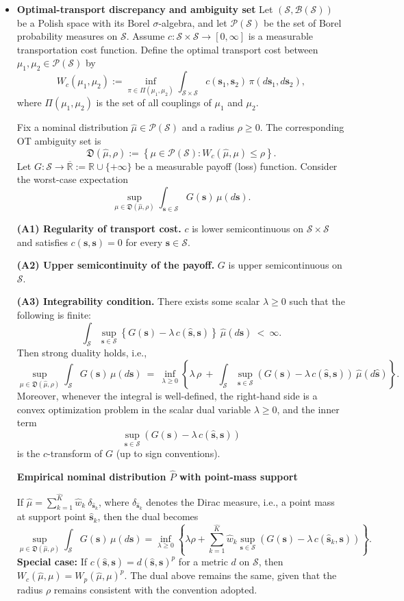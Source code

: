 \documentclass[opre,sglanonrev]{informs4}
\newcommand{\mS}{\mathcal{S}}
\newcommand{\mP}{\mathcal{P}}
\newcommand{\mbR}{\mathbb R}
\newcommand{\hbs}{\hat{\bs}}
\newcommand{\bs}{\bm{s}}
\newcommand{\srevision}[1]{{\color{black}{#1}}}
\begin{document}
{\begin{APPENDICES}
\begin{itemize}[leftmargin=1em]
\item[\textbf{A.4}] \textbf{Optimal-transport discrepancy and ambiguity set\srevision{~\cite[Theorem 1]{blanchet2019quantifying}.}}
Let $(\mS,\mathcal{B}(\mS))$ be a Polish space with its Borel $\sigma$-algebra,
and let $\mP(\mS)$ be the set of Borel probability measures on $\mS$. Assume $c: \mS \times \mS \to [0,\infty]$ is a measurable transportation cost function. Define
the optimal transport cost between $\mu_1,\mu_2\in \mP(\mS)$ by
\[
W_c(\mu_1,\mu_2)
:=
\inf_{\pi\in \Pi(\mu_1,\mu_2)}
\int_{\mS \times \mS} c(\bs_1,\bs_2)\,\pi(d\bs_1,d\bs_2),
\]
where $\Pi(\mu_1,\mu_2)$ is the set of all couplings of $\mu_1$ and $\mu_2$.

Fix a nominal distribution $\hat{\mu}\in \mP(\mS)$ and a radius $\rho \ge 0$. The corresponding OT ambiguity set is
\[
\mathfrak{D}(\hat{\mu},\rho)
:=
\left\{\mu\in \mP(\mS): W_c(\hat{\mu},\mu)\le \rho \right\}.
\]
Let $G: \mS\to \overline{\mbR}:=\mbR\cup\{+\infty\}$ be a measurable payoff (loss) function. Consider the worst-case expectation
\[
\sup_{\mu \in\mathfrak{D}(\hat{\mu},\rho)} \int_{\bs \in \mS} G(\bs)\, \mu(d\bs).
\]

\noindent\textbf{(A1) Regularity of transport cost.} $c$ is lower semicontinuous on
$\mS\times \mS$ and satisfies $c(\bs,\bs)=0$ for every $\bs\in \mS$.

\noindent\textbf{(A2) Upper semicontinuity of the payoff.} $G$ is upper semicontinuous on $\mS$.

\noindent\textbf{(A3) Integrability condition.} There exists some scalar $\lambda\ge 0$ such that the following is finite:
\[
\int_\mS \sup_{\bs\in \mS}\left\{G(\bs)-\lambda\,c(\hbs,\bs)\right\}\ \hat{\mu}(d\hbs)\ <\ \infty.
\]
Then strong duality holds, i.e.,
\[
\sup_{\mu\in\mathfrak{D}(\hat{\mu},\rho)} \int_\mS G(\bs)\, \mu(d\bs)
\ =\ 
\inf_{\lambda\ge 0}\left\{\lambda\,\rho\ +\ \int_\mS \sup_{\bs\in \mS}\left(G(\bs)-\lambda\,c(\hbs,\bs)\right)\ \hat{\mu}(d\hbs)\right\}.
\]
Moreover, whenever the integral is well-defined, the right-hand side is a
convex optimization problem in the scalar dual variable $\lambda\ge 0$,
and the inner term
\[
\sup_{\bs\in \mS}\left(G(\bs)-\lambda\,c(\hbs,\bs)\right)
\]
is the $c$-transform of $G$ (up to sign conventions).


\noindent\textbf{Empirical nominal distribution $\widehat P$ with point-mass support}

If $\hat{\mu}=\sum_{k=1}^{\hat{K}}\hat{w}_k\ \delta_{\hbs_k}$, where $\delta_{\hbs_k}$ denotes the Dirac measure, i.e., a point mass at support point $\hbs_k$, then the dual becomes
\[
\sup_{\mu\in\mathfrak{D}(\hat{\mu},\rho)} \int_{\mS}G(\bs)\,\mu(d\bs)
=
\inf_{\lambda\ge 0}
\left\{
\lambda\rho
+
\sum_{k=1}^{\hat{K}}\hat{w}_k
\sup_{\bs\in \mS}
\left(G(\bs)-\lambda\,c(\hbs_k,\bs)\right)
\right\}.
\]
\textbf{Special case:} If $c(\hbs,\bs)=d(\hbs,\bs)^p$ for a metric $d$ on
\(\mS\), then \(W_c(\hat{\mu},\mu)=W_p(\hat{\mu},\mu)^p\). The dual above remains the same, given that the radius $\rho$ remains consistent with the convention adopted.



\end{itemize}
\end{APPENDICES}}
\end{document}
